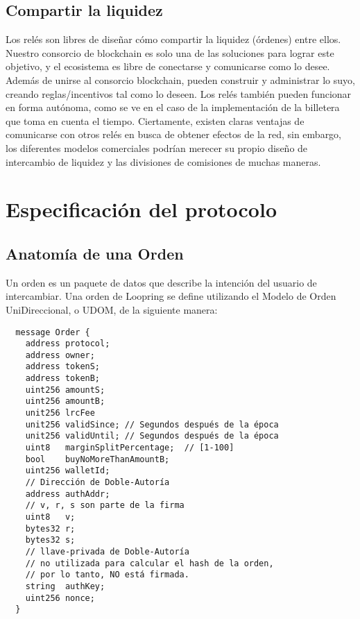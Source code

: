 \documentclass[UTF8,nofonts]{article}
\begin{document}
\begin{multicols}{2}
\subsection{Compartir la liquidez\label{sec:liquidity_sharing}}
Los rel\'es son libres de dise\~nar c\'omo compartir la liquidez (\'ordenes) entre ellos. Nuestro consorcio de blockchain es solo una de las soluciones para lograr este objetivo, y el ecosistema es libre de conectarse y comunicarse como lo desee. Adem\'as de unirse al consorcio blockchain, pueden construir y administrar lo suyo, creando reglas/incentivos tal como lo deseen. Los rel\'es tambi\'en pueden funcionar en forma aut\'onoma, como se ve en el caso de la implementaci\'on de la billetera que toma en cuenta el tiempo. Ciertamente, existen claras ventajas de comunicarse con otros rel\'es en busca de obtener efectos de la red, sin embargo, los diferentes modelos comerciales podr\'ian merecer su propio dise\~no de intercambio de liquidez y las divisiones de comisiones de muchas maneras.

\section{Especificaci\'on del protocolo\label{sec:protocol}}

\subsection{Anatom\'ia de una Orden\label{anatomy}}
Un orden es un paquete de datos que describe la intenci\'on del usuario de intercambiar. Una orden de Loopring se define utilizando el Modelo de Orden UniDireccional, o UDOM, de la siguiente manera:

\begin{verbatim}
  message Order {
    address protocol;
    address owner;
    address tokenS;
    address tokenB;
    uint256 amountS;
    uint256 amountB;
    unit256 lrcFee
    unit256 validSince; // Segundos después de la época
    unit256 validUntil; // Segundos después de la época
    uint8   marginSplitPercentage;  // [1-100]
    bool    buyNoMoreThanAmountB;
    uint256 walletId;
    // Dirección de Doble-Autoría
    address authAddr;
   	// v, r, s son parte de la firma
    uint8   v;       
    bytes32 r;
    bytes32 s;
    // llave-privada de Doble-Autoría
    // no utilizada para calcular el hash de la orden,
    // por lo tanto, NO está firmada.
    string  authKey;          
    uint256 nonce;
  }
\end{verbatim}


\end{multicols}
\end{document}
